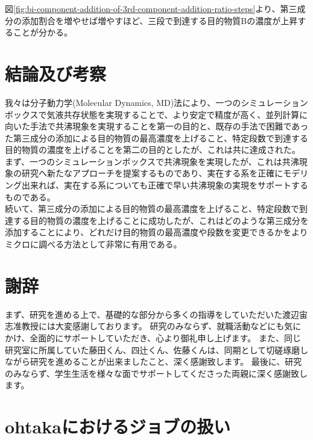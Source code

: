 \documentclass[titlepage]{jsreport}
\begin{document}
図\ref{fig:bi-component-addition-of-3rd-component-addition-ratio-steps}より、第三成分の添加割合を増やせば増やすほど、三段で到達する目的物質Bの濃度が上昇することが分かる。


\chapter{結論及び考察} \label{chap:summary}
我々は分子動力学(Molecular Dynamics, MD)法\cite{molecular-dynamics}により、一つのシミュレーションボックスで気液共存状態を実現することで、より安定で精度が高く、並列計算に向いた手法で共沸現象を実現することを第一の目的と、既存の手法で困難であった第三成分の添加による目的物質の最高濃度を上げること、特定段数で到達する目的物質の濃度を上げることを第二の目的としたが、これは共に達成された。\\
まず、一つのシミュレーションボックスで共沸現象を実現したが、これは共沸現象の研究へ新たなアプローチを提案するものであり、実在する系を正確にモデリング出来れば、実在する系についても正確で早い共沸現象の実現をサポートするものである。\\
続いて、第三成分の添加による目的物質の最高濃度を上げること、特定段数で到達する目的物質の濃度を上げることに成功したが、これはどのような第三成分を添加することにより、どれだけ目的物質の最高濃度や段数を変更できるかをよりミクロに調べる方法として非常に有用である。


\chapter*{謝辞}
まず、研究を進める上で、基礎的な部分から多くの指導をしていただいた渡辺宙志准教授には大変感謝しております。
研究のみならず、就職活動などにも気にかけ、全面的にサポートしていただき、心より御礼申し上げます。
また、同じ研究室に所属していた藤田くん、四辻くん、佐藤くんは、同期として切磋琢磨しながら研究を進めることが出来ましたこと、深く感謝致します。
最後に、研究のみならず、学生生活を様々な面でサポートしてくださった両親に深く感謝致します。

\appendix
\chapter{ohtakaにおけるジョブの扱い}

\end{document}
